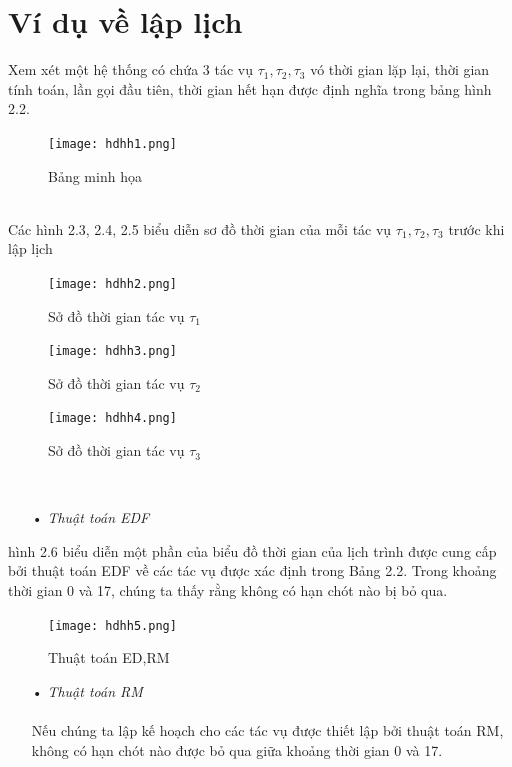 \documentclass[a4paper,10pt]{report}
\begin{document}
\section{Ví dụ về lập lịch}
Xem xét một hệ thống có chứa 3 tác vụ $\tau_1, \tau_2, \tau_3$ vó thời gian lặp lại, thời gian tính toán, lần gọi đầu tiên, thời gian hết hạn được định nghĩa trong bảng hình 2.2.
\begin{figure}[h]
\begin{center}
\texttt{[image: hdhh1.png]}
\caption{Bảng minh họa}
\end{center}
\end{figure}
\\ 
Các hình 2.3, 2.4, 2.5 biểu diễn sơ đồ thời gian của mỗi tác vụ $\tau_1, \tau_2, \tau_3$ trước khi lập lịch
\begin{figure}[h]
\begin{center}
\texttt{[image: hdhh2.png]}
\caption{Sở đồ thời gian tác vụ $\tau_1$}
\end{center}
\end{figure}
\begin{figure}[h]
\begin{center}
\texttt{[image: hdhh3.png]}
\caption{Sở đồ thời gian tác vụ $\tau_2$}
\end{center}
\end{figure}
\begin{figure}[h]
\begin{center}
\texttt{[image: hdhh4.png]}
\caption{Sở đồ thời gian tác vụ $\tau_3$}
\end{center}
\end{figure} \\
\begin{itemize}
\item[•] \textit{Thuật toán EDF}
\end{itemize}
hình 2.6 biểu diễn một phần của biểu đồ thời gian của lịch trình được cung cấp bởi thuật toán EDF về các tác vụ được xác định trong Bảng 2.2. Trong khoảng thời gian 0 và 17, chúng ta thấy rằng không có hạn chót nào bị bỏ qua.
\begin{figure}[h]
\begin{center}
\texttt{[image: hdhh5.png]}
\caption{Thuật toán ED,RM}
\end{center}
\end{figure}
\begin{itemize}
\item[•] \textit{Thuật toán RM}\\ \\
Nếu chúng ta lập kế hoạch cho các tác vụ được thiết lập bởi thuật toán RM, không có hạn chót nào được bỏ qua giữa khoảng thời gian 0 và 17.
\end{itemize}
\end{document}
